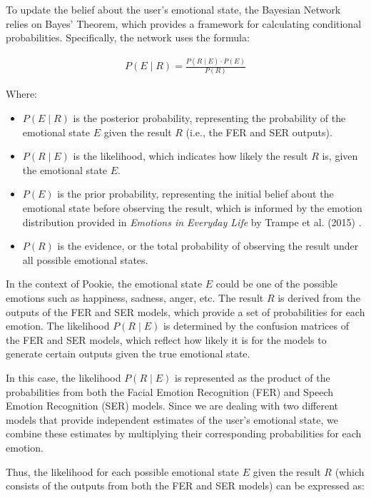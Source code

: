 To update the belief about the user’s emotional state, the Bayesian Network relies on Bayes’ Theorem, which provides a framework for calculating conditional probabilities. Specifically, the network uses the formula:

\begin{gather}
    P(E \mid R) = \frac{P(R \mid E) \cdot P(E)}{P(R)}
\end{gather}

Where:
\begin{itemize}
    \item \( P(E \mid R) \) is the posterior probability, representing the probability of the emotional state \( E \) given the result \( R \) (i.e., the FER and SER outputs).
    \item \( P(R \mid E) \) is the likelihood, which indicates how likely the result \( R \) is, given the emotional state \( E \).
    \item \( P(E) \) is the prior probability, representing the initial belief about the emotional state before observing the result, which is informed by the emotion distribution provided in \textit{Emotions in Everyday Life} by Trampe et al. (2015) \cite{10.1371/journal.pone.0145450}.
    \item \( P(R) \) is the evidence, or the total probability of observing the result under all possible emotional states.
\end{itemize}

In the context of Pookie, the emotional state \( E \) could be one of the possible emotions such as happiness, sadness, anger, etc. The result \( R \) is derived from the outputs of the FER and SER models, which provide a set of probabilities for each emotion. The likelihood \( P(R \mid E) \) is determined by the confusion matrices of the FER and SER models, which reflect how likely it is for the models to generate certain outputs given the true emotional state.

In this case, the likelihood \( P(R \mid E) \) is represented as the product of the probabilities from both the Facial Emotion Recognition (FER) and Speech Emotion Recognition (SER) models. Since we are dealing with two different models that provide independent estimates of the user’s emotional state, we combine these estimates by multiplying their corresponding probabilities for each emotion.

Thus, the likelihood for each possible emotional state \( E \) given the result \( R \) (which consists of the outputs from both the FER and SER models) can be expressed as:

